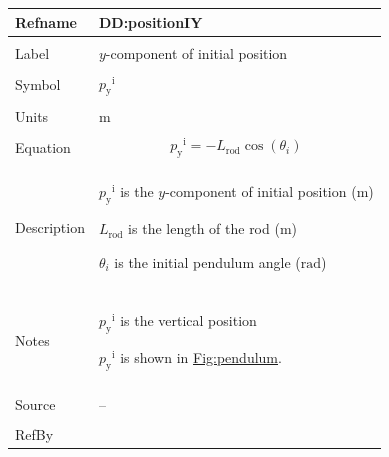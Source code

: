 \documentclass[12pt]{article}
\begin{document}
\vspace{\baselineskip}
\noindent
\begin{minipage}{\textwidth}
\begin{tabular}{>{\raggedright}p{}>{\raggedright\arraybackslash}p{}}
\toprule \textbf{Refname} & \textbf{DD:positionIY}
\label{DD:positionIY}
\\ \midrule \\
Label & $y$-component of initial position
        
\\ \midrule \\
Symbol & ${{p_{\text{y}}}^{\text{i}}}$
         
\\ \midrule \\
Units & ${\text{m}}$
        
\\ \midrule \\
Equation & \begin{displaymath}
           {{p_{\text{y}}}^{\text{i}}}=-{L_{\text{rod}}} \cos\left({θ_{i}}\right)
           \end{displaymath}
\\ \midrule \\
Description & \begin{symbDescription}
              \item{${{p_{\text{y}}}^{\text{i}}}$ is the $y$-component of initial position (${\text{m}}$)}
              \item{${L_{\text{rod}}}$ is the length of the rod (${\text{m}}$)}
              \item{${θ_{i}}$ is the initial pendulum angle (${\text{rad}}$)}
              \end{symbDescription}
\\ \midrule \\
Notes & ${{p_{\text{y}}}^{\text{i}}}$ is the vertical position
        
        ${{p_{\text{y}}}^{\text{i}}}$ is shown in \hyperref[Figure:pendulum]{Fig:pendulum}.
        
\\ \midrule \\
Source & --
         
\\ \midrule \\
RefBy & 
\\ \bottomrule
\end{tabular}
\end{minipage}
\end{document}
